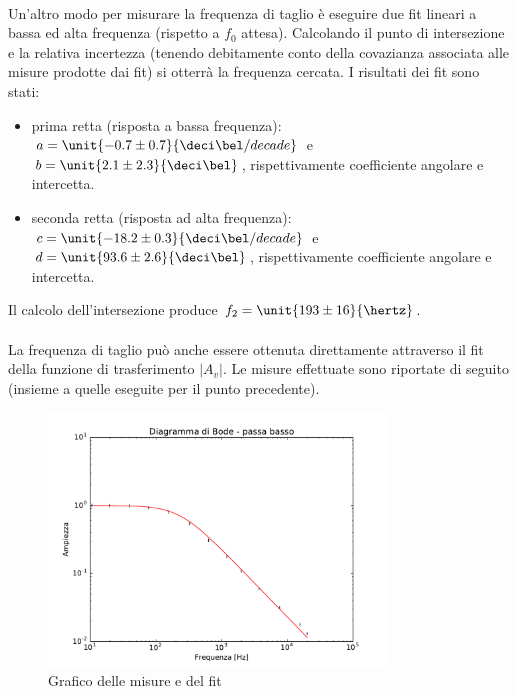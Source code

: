 \documentclass[10pt,a4paper]{article}
\begin{document}
\paragraph{} Un'altro modo per misurare la frequenza di taglio è eseguire due fit lineari a bassa ed alta frequenza (rispetto a $f_0$ attesa). Calcolando il punto di intersezione e la relativa incertezza (tenendo debitamente conto della covazianza associata alle misure prodotte dai fit) si otterrà la frequenza cercata. I risultati dei fit sono stati: 
\begin{itemize}
	\item prima retta (risposta a bassa frequenza):	 $a=\unit{-0.7 \pm 0.7}{\deci\bel/decade}$ e	 $b=\unit{2.1 \pm 2.3}{\deci\bel}$, rispettivamente coefficiente angolare e intercetta.
	\item seconda retta (risposta ad alta frequenza):	 $c=\unit{-18.2 \pm 0.3}{\deci\bel/decade}$ e	 $d=\unit{93.6 \pm 2.6}{\deci\bel}$, rispettivamente coefficiente angolare e intercetta.
\end{itemize}
Il calcolo dell'intersezione produce $f_2 =\unit{ 193 \pm 16}{\hertz}$.

\paragraph{} La frequenza di taglio può anche essere ottenuta direttamente attraverso il fit della funzione di trasferimento $|A_v|$. Le misure effettuate sono riportate di seguito (insieme a quelle eseguite per il punto precedente).

\begin{figure}[h!]
	\centering
		
\end{figure}
\begin{figure}[h]
		\centering
		\includegraphics[width=0.8\textwidth]{../grafici/fit_Bode_Lowpass_800ohm.pdf}
		\caption{Grafico delle misure e del fit}
\end{figure}
\end{document}
